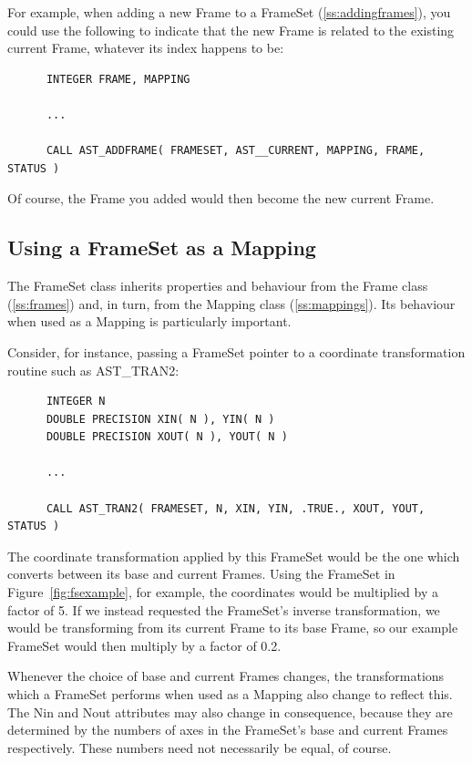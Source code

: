 \documentclass[twoside,11pt]{article}
\newcommand{\htmlref}[2]{#1}
\newcommand{\secref}[1]{\S\ref{#1}}
\renewcommand{\secref}[1]{\ref{#1}}
\begin{document}
For example, when adding a new Frame to a FrameSet
(\secref{ss:addingframes}), you could use the following to indicate
that the new Frame is related to the existing current Frame, whatever
its index happens to be:

\small
\begin{verbatim}
      INTEGER FRAME, MAPPING

      ...

      CALL AST_ADDFRAME( FRAMESET, AST__CURRENT, MAPPING, FRAME, STATUS )
\end{verbatim}
\normalsize

Of course, the Frame you added would then become the new current
Frame.

\subsection{\label{ss:framesetasmapping}Using a FrameSet as a Mapping}

The \htmlref{FrameSet}{FrameSet} class inherits properties and behaviour from the \htmlref{Frame}{Frame}
class (\secref{ss:frames}) and, in turn, from the \htmlref{Mapping}{Mapping} class
(\secref{ss:mappings}). Its behaviour when used as a Mapping is
particularly important.

Consider, for instance, passing a FrameSet pointer to a coordinate
transformation routine such as \htmlref{AST\_TRAN2}{AST_TRAN2}:

\small
\begin{verbatim}
      INTEGER N
      DOUBLE PRECISION XIN( N ), YIN( N )
      DOUBLE PRECISION XOUT( N ), YOUT( N )

      ...

      CALL AST_TRAN2( FRAMESET, N, XIN, YIN, .TRUE., XOUT, YOUT, STATUS )
\end{verbatim}
\normalsize

The coordinate transformation applied by this FrameSet would be the
one which converts between its base and current Frames. Using the
FrameSet in Figure~\ref{fig:fsexample}, for example, the coordinates
would be multiplied by a factor of 5.  If we instead requested the
FrameSet's inverse transformation, we would be transforming from its
current Frame to its base Frame, so our example FrameSet would then
multiply by a factor of 0.2.

Whenever the choice of base and current Frames changes, the
transformations which a FrameSet performs when used as a Mapping also
change to reflect this. The \htmlref{Nin}{Nin} and \htmlref{Nout}{Nout} attributes may also change in
consequence, because they are determined by the numbers of axes in the
FrameSet's base and current Frames respectively. These numbers need
not necessarily be equal, of course.
\end{document}
